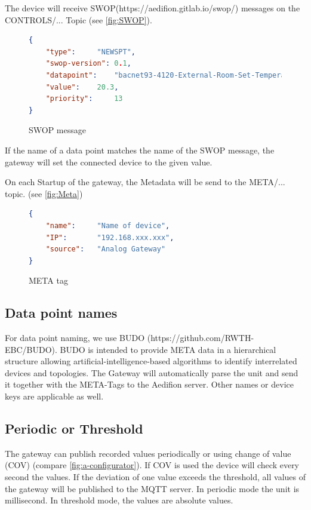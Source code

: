 \documentclass[10pt,letterpaper]{article}
\begin{document}
		The device will receive SWOP(https://aedifion.gitlab.io/swop/) messages on the CONTROLS/... Topic (see \autoref{fig:SWOP}). \\

		\begin{figure}[ht!]
		\begin{lstlisting}[language=json,firstnumber=1]		
{
	"type": 	"NEWSPT",
	"swop-version":	0.1,
	"datapoint": 	"bacnet93-4120-External-Room-Set-Temperature-RTs",
	"value": 	20.3,
	"priority": 	13
}
				\end{lstlisting}
				\caption{SWOP message}
				\label{fig:SWOP}
		\end{figure}
		If the name of a data point matches the name of the SWOP message, the gateway will set the connected device to the given value.

		On each Startup of the gateway, the Metadata will be send to the META/... topic. (see \autoref{fig:Meta})

		\begin{figure}[ht!]
		\begin{lstlisting}[language=json,firstnumber=1]
{
	"name": 	"Name of device",
	"IP": 		"192.168.xxx.xxx",  
	"source": 	"Analog Gateway"
}
		\end{lstlisting}
		\caption{META tag}
		\label{fig:Meta}
		\end{figure}

		\subsection{Data point names}
		For data point naming, we use BUDO (https://github.com/RWTH-EBC/BUDO). BUDO is intended to provide META data in a hierarchical structure allowing artificial-intelligence-based algorithms to identify interrelated devices and topologies.
		The Gateway will automatically parse the unit and send it together with the META-Tags to the Aedifion server. 
		Other names or device keys are applicable as well.

		\subsection{Periodic or Threshold}
		The gateway can publish recorded values periodically or using change of value (COV) (compare \autoref{fig:a-configurator}). 
		If COV is used the device will check every second the values. 
		If the deviation of one value exceeds the threshold,  all values of the gateway will be published to the MQTT server. 
		In periodic mode the unit is millisecond. 
		In threshold mode, the values are absolute values.
\end{document}
